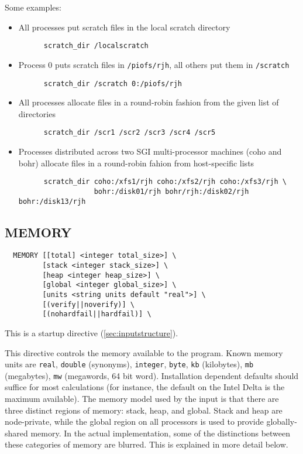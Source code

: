 Some examples:
\begin{itemize}
\item  All processes put scratch files in the local scratch directory
\begin{verbatim}
      scratch_dir /localscratch
\end{verbatim}
\item Process 0 puts scratch files in \verb+/piofs/rjh+, all others put them
  in \verb+/scratch+
\begin{verbatim}
      scratch_dir /scratch 0:/piofs/rjh
\end{verbatim}
\item All processes allocate files in a round-robin fashion from the
given list of directories
\begin{verbatim}
      scratch_dir /scr1 /scr2 /scr3 /scr4 /scr5
\end{verbatim}
\item Processes distributed across two SGI multi-processor machines
  (coho and bohr) allocate files in a round-robin fahion from
  host-specific lists
\begin{verbatim}
      scratch_dir coho:/xfs1/rjh coho:/xfs2/rjh coho:/xfs3/rjh \
                  bohr:/disk01/rjh bohr/rjh:/disk02/rjh bohr:/disk13/rjh
\end{verbatim}
\end{itemize}

\subsection{MEMORY}

\begin{verbatim}
  MEMORY [[total] <integer total_size>] \
         [stack <integer stack_size>] \
         [heap <integer heap_size>] \
         [global <integer global_size>] \
         [units <string units default "real">] \
         [(verify||noverify)] \
         [(nohardfail||hardfail)] \
\end{verbatim}

This is a startup directive (\ref{sec:inputstructure}).

This directive controls the memory available to the program.  Known
memory units are \verb+real+, \verb+double+ (synonyms),
\verb+integer+, \verb+byte+, \verb+kb+ (kilobytes), \verb+mb+
(megabytes), \verb+mw+ (megawords, 64 bit word).  Installation
dependent defaults should suffice for most calculations (for instance,
the default on the Intel Delta is the maximum available).  The memory
model used by the input is that there are three distinct regions of
memory: stack, heap, and global.  Stack and heap are node-private,
while the global region on all processors is used to provide
globally-shared memory.  In the actual implementation, some of the
distinctions between these categories of memory are blurred.  This is
explained in more detail below.


